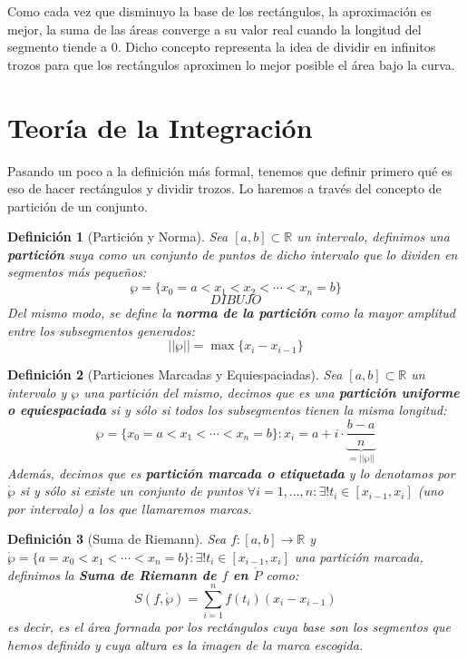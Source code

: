 \documentclass[10pt,a4paper,openright]{book}
\theoremstyle{break}
\newtheorem{defi}{Definición}[chapter]
\begin{document}
Como cada vez que disminuyo la base de los rectángulos, la aproximación es mejor, la suma de las áreas converge a su valor real cuando la longitud del segmento tiende a 0. Dicho concepto representa la idea de dividir en infinitos trozos  para que los rectángulos aproximen lo mejor posible el área bajo la curva.

\section{Teoría de la Integración}
Pasando un poco a la definición más formal, tenemos que definir primero qué es eso de hacer rectángulos y dividir trozos. Lo haremos a través del concepto de partición de un conjunto.
\begin{defi}[Partición y Norma]
Sea $[a,b]\subset \mathbb{R}$ un intervalo, definimos una \textbf{partición} suya como un conjunto de puntos de dicho intervalo que lo dividen en segmentos más pequeños:
$$\wp=\{x_0=a<x_1<x_2<\cdots <x_n=b\}$$
$$DIBUJO$$
Del mismo modo, se define la \textbf{norma de la partición} como  la mayor amplitud entre los subsegmentos generados:
$$||\wp||=\max\{x_i-x_{i-1}\}$$
\end{defi}

\begin{defi}[Particiones Marcadas y Equiespaciadas]
Sea $[a,b]\subset \mathbb{R}$ un intervalo y $\wp$ una partición del mismo, decimos que es una \textbf{partición uniforme o equiespaciada} si y sólo si todos los subsegmentos tienen la misma longitud:
$$\wp=\{x_0=a < x_1< \cdots < x_n=b\}: x_i = a + i \cdot \underbrace{\frac{b-a}{n}}_{=||\wp||}$$
Además, decimos que es \textbf{partición marcada o etiquetada}  y lo denotamos por $\mathring{\wp}$ si y sólo si existe un conjunto de puntos $\forall i = 1, ..., n: \exists! t_i\in [x_{i-1}, x_i]$ (uno por intervalo) a los que llamaremos marcas.
\end{defi}

\begin{defi}[Suma de Riemann]
Sea $f: [a,b]\rightarrow \mathbb R$ y $\mathring{\wp}=\{a=x_0<x_1<\cdots < x_n = b\}: \exists! t_i\in [x_{i-1}, x_i]$ una partición marcada, definimos la \textbf{Suma de Riemann de $f$ en $\mathring{P}$} como:
$$S(f,\mathring{\wp})=\sum_{i=1}^n f(t_i)(x_i-x_{i-1})$$
es decir, es el área formada por los rectángulos cuya base son los segmentos que hemos definido y cuya altura es la imagen de la marca escogida.
\end{defi}
\end{document}
